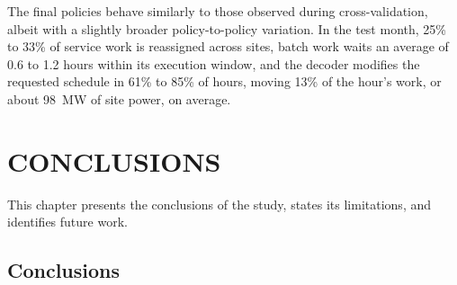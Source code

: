 \documentclass{UNCC-thesis}
\begin{document}
The final policies behave similarly to those observed during cross-validation, albeit with a
slightly broader policy-to-policy variation. In the test month, 25\% to 33\% of service work is
reassigned across sites, batch work waits an average of 0.6 to 1.2 hours within its execution
window, and the decoder modifies the requested schedule in 61\% to 85\% of hours, moving 13\% of
the hour's work, or about 98~MW of site power, on average.

\chapter{CONCLUSIONS}
\label{chap:discussion}

This chapter presents the conclusions of the study, states its limitations, and identifies future
work.

\section{Conclusions}
\label{sec:discussion-findings}
\end{document}
